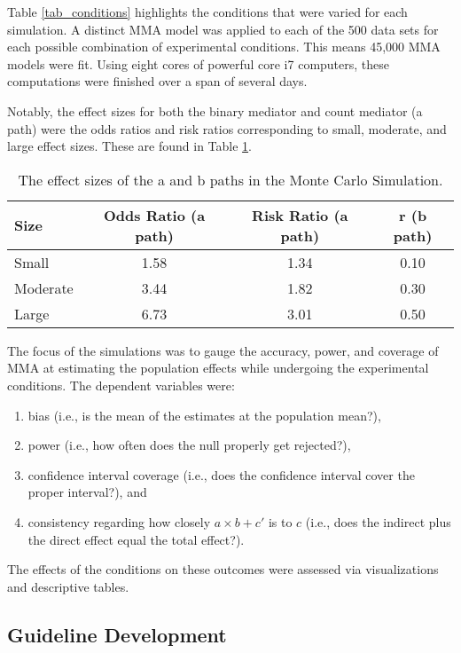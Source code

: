 \documentclass[]{article}
\providecommand{\tightlist}{%
  \setlength{\itemsep}{0pt}\setlength{\parskip}{0pt}}
\begin{document}
Table \ref{tab_conditions} highlights the conditions that were varied
for each simulation. A distinct MMA model was applied to each of the 500
data sets for each possible combination of experimental conditions. This
means 45,000 MMA models were fit. Using eight cores of powerful core i7
computers, these computations were finished over a span of several days.

Notably, the effect sizes for both the binary mediator and count
mediator (a path) were the odds ratios and risk ratios corresponding to
small, moderate, and large effect sizes. These are found in Table
\ref{effectsizes}.

\begin{table}[tb]
\centering
\caption{The effect sizes of the a and b paths in the Monte Carlo Simulation.} 
\label{effectsizes}
\begin{tabular}{lccc}
Size & Odds Ratio (a path) & Risk Ratio (a path) & r (b path) \\ 
\midrule
Small    & 1.58 & 1.34 & 0.10 \\ 
Moderate & 3.44 & 1.82 & 0.30 \\
Large    & 6.73 & 3.01 & 0.50 \\ 
\end{tabular}
\end{table}

The focus of the simulations was to gauge the accuracy, power, and
coverage of MMA at estimating the population effects while undergoing
the experimental conditions. The dependent variables were:

\begin{enumerate}
\def\labelenumi{\arabic{enumi}.}
\tightlist
\item
  bias (i.e., is the mean of the estimates at the population mean?),
\item
  power (i.e., how often does the null properly get rejected?),
\item
  confidence interval coverage (i.e., does the confidence interval cover
  the proper interval?), and
\item
  consistency regarding how closely \(a \times b + c'\) is to \(c\)
  (i.e., does the indirect plus the direct effect equal the total
  effect?).
\end{enumerate}

\noindent The effects of the conditions on these outcomes were assessed
via visualizations and descriptive tables.

\subsection{Guideline Development}\label{guideline-development}
\end{document}
